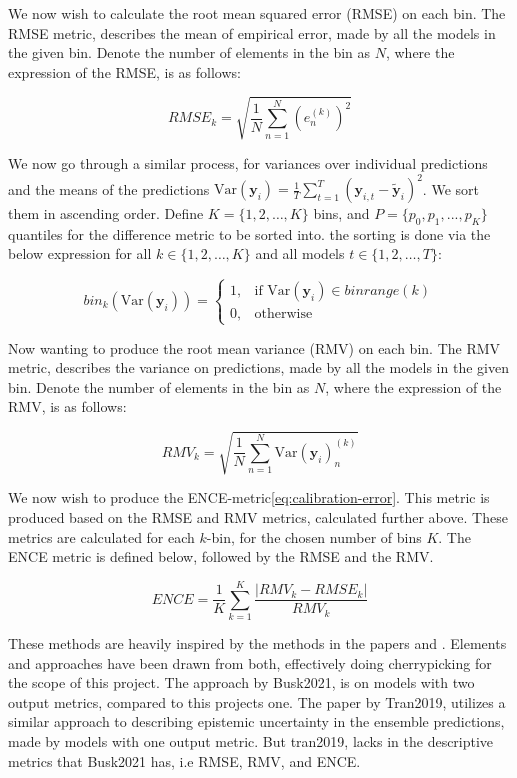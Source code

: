 We now wish to calculate the root mean squared error (RMSE) on each bin. The RMSE metric, describes the mean of empirical error, made
by all the models in the given bin. 
Denote the number of elements in the bin as $N$, where the
expression of the RMSE, is as follows:

\begin{equation}
    RMSE_{k} = \sqrt{\frac{1}{N} \sum_{n=1}^N \left( e_{n}^{(k)} \right)^2}
\end{equation}

We now go through a similar process, for variances over individual predictions and the means of the predictions 
$\text{Var}(\mathbf{y}_{i}) = \frac{1}{T} \sum_{t=1}^T (\mathbf{y}_{i,t} - \tilde{\mathbf{y}}_i)^2$. 
We sort them in ascending order. Define $K = \{1,2,\ldots,K\}$ bins, and $P = \{p_0, p_1, ..., p_K\}$ 
quantiles for the difference metric to be sorted into. the sorting is done via the below expression for all $k \in \{1,2,\ldots,K\}$ 
and all models $t \in \{1,2,\ldots,T\}$:

\begin{equation}\label{eq:bin-difference}
    bin_{k}(\text{Var}(\mathbf{y}_{i})) =\begin{cases}
        1, & \text{if } \text{Var}(\mathbf{y}_{i}) \in binrange(k) \\
        0, & \text{otherwise}
    \end{cases}
\end{equation}

Now wanting to produce the root mean variance (RMV) on each bin. The RMV metric, describes the variance on predictions, made
by all the models in the given bin.
Denote the number of elements in the bin as $N$, where the
expression of the RMV, is as follows:

\begin{equation}
    RMV_{k} = \sqrt{\frac{1}{N} \sum_{n=1}^N  \text{Var}(\mathbf{y}_{i})_{n}^{(k)}}
\end{equation}

We now wish to produce the ENCE-metric\ref{eq:calibration-error}\cite{Busk2021}.
This metric is produced based on the RMSE and RMV metrics, calculated further above.
These metrics are calculated for each $k$-bin, for the chosen number of bins $K$. The ENCE metric
is defined below, followed by the RMSE and the RMV.

\begin{equation}\label{eq:calibration-error}
    ENCE = \frac{1}{K} \sum_{k=1}^K \frac{|RMV_{k} - RMSE_{k}|}{RMV_{k}}
\end{equation}

These methods are heavily inspired by the methods in the papers\cite{Tran2019} and \cite{Busk2021}. Elements and approaches have been 
drawn from both, effectively doing cherrypicking for the scope of this project. The approach by Busk2021, is on models with two output
metrics, compared to this projects one. The paper by Tran2019, utilizes a similar approach to describing epistemic uncertainty in the
ensemble predictions, made by models with one output metric. But tran2019, lacks in the descriptive metrics that Busk2021 has, i.e 
RMSE, RMV, and ENCE.


\newpage
